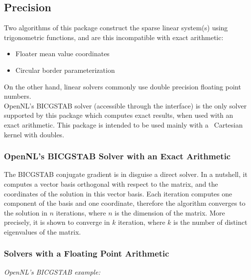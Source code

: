 \subsection{Precision}

Two algorithms of this package construct the sparse linear system(s)
using trigonometric functions, and are this incompatible with exact arithmetic:

\begin{itemize}

\item Floater mean value coordinates

\item Circular border parameterization

\end{itemize}

On the other hand, linear solvers commonly use double precision floating point
numbers. \\
OpenNL's BICGSTAB solver (accessible through the
 interface)
is the only solver supported by this package which 
computes exact results, when used with an exact arithmetic. This package is
intended to be used mainly with a \cgal\ Cartesian kernel with doubles.


\subsubsection{OpenNL's BICGSTAB Solver with an Exact Arithmetic}

The BICGSTAB conjugate gradient is in disguise a direct solver.
In a nutshell, it computes a vector basis
orthogonal with respect to the matrix, and the coordinates of the solution in this vector basis.
Each iteration computes one component of the basis and one coordinate, therefore the algorithm
converges to the solution in $n$ iterations, where $n$ is the dimension of the matrix. More precisely, it is shown to converge in $k$ iteration, where $k$ is the number of distinct eigenvalues of the matrix. 


\subsubsection{Solvers with a Floating Point Arithmetic}

\emph{OpenNL's BICGSTAB example:}

